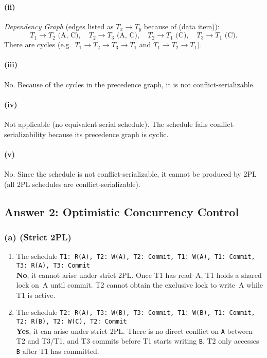 \documentclass[11pt]{article}
\begin{document}
\paragraph{(ii)}
\emph{Dependency Graph} (edges listed as {\small $T_x \to T_y$ because of (data item)}):
\[
T_1 \to T_2 \text{ (A, C)}, \quad
T_2 \to T_3 \text{ (A, C)}, \quad
T_2 \to T_1 \text{ (C)}, \quad
T_3 \to T_1 \text{ (C)}.
\]
There are cycles (e.g.\ $T_1 \to T_2 \to T_3 \to T_1$ and $T_1 \to T_2 \to T_1$).

\paragraph{(iii)}
No. Because of the cycles in the precedence graph, it is not conflict-serializable.

\paragraph{(iv)}
Not applicable (no equivalent serial schedule). The schedule fails conflict-serializability because its precedence graph is cyclic.

\paragraph{(v)}
No. Since the schedule is not conflict-serializable, it cannot be produced by 2PL (all 2PL schedules are conflict-serializable).

\subsection*{Answer 2: Optimistic Concurrency Control}

\subsubsection*{(a) \; (Strict 2PL)}
\begin{enumerate}
  \item The schedule \texttt{T1: R(A), T2: W(A), T2: Commit, T1: W(A), T1: Commit, T3: R(A), T3: Commit} \\
  \textbf{No}, it cannot arise under strict 2PL. Once T1 has read~A, T1 holds a shared lock on~A until commit. T2 cannot obtain the exclusive lock to write~A while T1 is active.

  \item The schedule \texttt{T2: R(A), T3: W(B), T3: Commit, T1: W(B), T1: Commit, T2: R(B), T2: W(C), T2: Commit} \\
  \textbf{Yes}, it can arise under strict 2PL. There is no direct conflict on \texttt{A} between T2 and T3/T1, and T3 commits before T1 starts writing \texttt{B}. T2 only accesses \texttt{B} after T1 has committed.
\end{enumerate}
\end{document}
